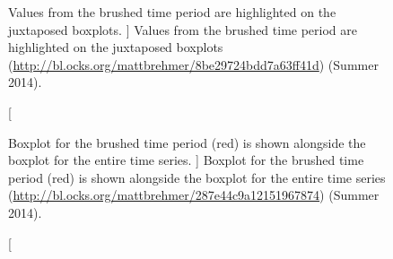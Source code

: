 

\begin{figure}
	\centering
	\caption
	[
	    Values from the brushed time period are highlighted on the juxtaposed boxplots.
	]
	{
    	Values from the brushed time period are highlighted on the juxtaposed boxplots (\url{http://bl.ocks.org/mattbrehmer/8be29724bdd7a63ff41d}) (Summer 2014). 
	}
	\centering
	\label{app:emu:fig:brushed-boxplots}
\end{figure}



\begin{figure}
	\centering
	\caption
	[
	    Boxplot for the brushed time period (red) is shown alongside the boxplot for the entire time series.
	]
	{
        Boxplot for the brushed time period (red) is shown alongside the boxplot for the entire time series (\url{http://bl.ocks.org/mattbrehmer/287e44c9a12151967874}) (Summer 2014). 
	}
	\centering
	\label{app:emu:fig:juxt-boxplots}
\end{figure}

